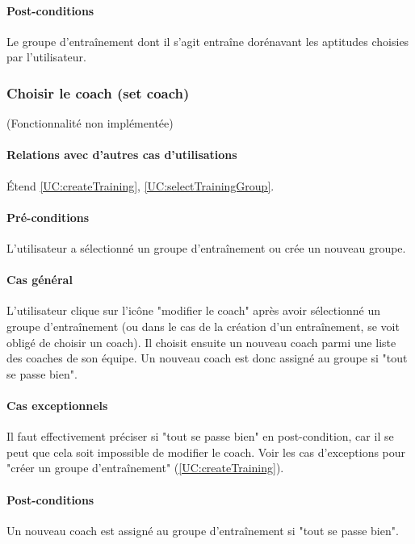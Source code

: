 \paragraph{Post-conditions}
\begin{list}{}{\leftmargin=1.5em}
\item{Le groupe d'entraînement dont il s'agit entraîne dorénavant les aptitudes choisies par l'utilisateur.}
\end{list}

\subsubsection{Choisir le coach (set coach)}
\label{UC:chooseTrainingCoach}
(Fonctionnalité non implémentée)
\paragraph{Relations avec d'autres cas d'utilisations}
Étend \ref{UC:createTraining}, \ref{UC:selectTrainingGroup}.
\paragraph{Pré-conditions}
\begin{list}{}{\leftmargin=1.5em}
\item{L'utilisateur a sélectionné un groupe d'entraînement ou crée un nouveau groupe.}
\end{list}
\paragraph{Cas général}
L'utilisateur clique sur l'icône "modifier le coach" après avoir sélectionné un groupe d'entraînement (ou dans le cas de la création d'un entraînement, se voit obligé de choisir un coach). Il choisit ensuite un nouveau coach parmi une liste des coaches de son équipe. Un nouveau coach est donc assigné au groupe si "tout se passe bien".
\paragraph{Cas exceptionnels}
Il faut effectivement préciser si "tout se passe bien" en post-condition, car il se peut que cela soit impossible de modifier le coach. Voir les cas d'exceptions pour "créer un groupe d'entraînement" (\ref{UC:createTraining}).
\paragraph{Post-conditions}
\begin{list}{}{\leftmargin=1.5em}
\item{Un nouveau coach est assigné au groupe d'entraînement si "tout se passe bien".}
\end{list}

